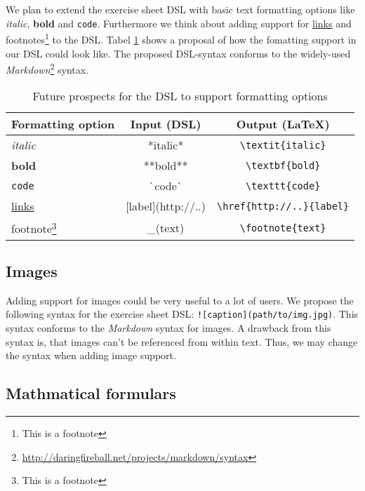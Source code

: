 \documentclass[12pt,letterpaper, onecolumn]{article}
\begin{document}
We plan to extend the exercise sheet DSL with basic text formatting options like \textit{italic}, \textbf{bold} and \texttt{code}. Furthermore we think about adding support for \underline{\href{http://google.com}{links}} and footnotes\footnote{This is a footnote} to the DSL. Tabel \ref{tab:formatting} shows a proposal of how the fomatting support in our DSL could look like. The proposed DSL-syntax conforms to the widely-used \emph{Markdown}\footnote{\url{http://daringfireball.net/projects/markdown/syntax}} syntax.

\begin{table}[!h]
	\centering
	\begin{tabular}{ | p{3.5cm} | c | c | }
		\hline
		Formatting option & Input (DSL) & Output (\LaTeX)\\ \hline
		\hline
		\textit{italic} & *italic* & \texttt{{\textbackslash}textit\{italic\}}\\
		\textbf{bold} & **bold** & \texttt{{\textbackslash}textbf\{bold\}} \\
		\texttt{code} & \`{}code\`{} & \texttt{{\textbackslash}texttt\{code\}} \\
		\underline{\href{http://google.com}{links}} & [label](http://..) & \texttt{{\textbackslash}href\{http://..\}\{label\}} \\
		footnote\footnote{This is a footnote} & \_(text) & \texttt{{\textbackslash}footnote\{text\}} \\
		\hline
	\end{tabular}
	\caption{Future prospects for the DSL to support formatting options}
	\label{tab:formatting}
\end{table}

\subsection{Images}

Adding support for images could be very useful to a lot of users. We propose the following syntax for the exercise sheet DSL: \texttt{![caption](path/to/img.jpg)}. This syntax conforms to the \emph{Markdown} syntax for images. A drawback from this syntax is, that images can't be referenced from within text. Thus, we may change the syntax when adding image support.\\

\subsection{Mathmatical formulars}
\end{document}
